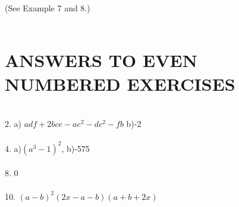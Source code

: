 \documentclass[a4paper,11pt]{amsbook}
\begin{document}
(See Example 7 and 8.)\\ \\ 
\section*{ANSWERS TO EVEN NUMBERED EXERCISES}
\mbox{ }\\
2. a) $adf+2bce-ae^2-dc^2-fb$ \hspace{20mm} b)-2\\ \\
4. a)$(a^3-1)^2$, \hspace{20mm} b)-575\\ \\
8. 0\\ \\
10. ${(a-b)^2}(2x-a-b)(a+b+2x)$\\
\end{document}
